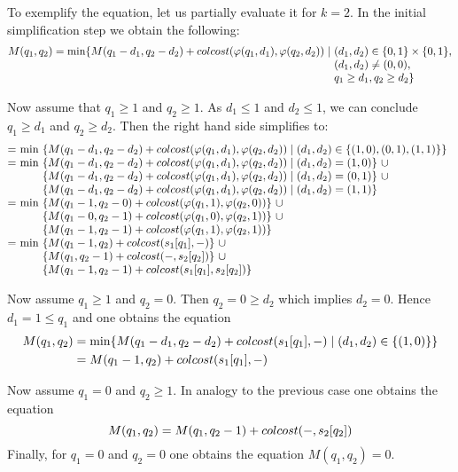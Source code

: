 \documentclass[12pt,a4paper]{scrartcl}
\newcommand{\Set}[1]{\{#1\}}
\newcommand{\Subchar}[2]{#1[#2]}
\newcommand{\Gap}[0]{\mathtt{\symbol{45}}}
\newcommand{\Minexpr}[0]{%
      M(q_{1}-d_{1},q_{2}-d_{2})+colcost(\varphi(q_{1},d_{1}),%
                                         \varphi(q_{2},d_{2}))}
\begin{document}
To exemplify the equation, let us partially evaluate it for \(k=2\).
In the initial simplification step we obtain the following:
\[
\begin{array}{@{}l@{}l@{~}l@{}}
M(q_{1},q_{2})
=\min\{&M(q_{1}-d_{1},q_{2}-d_{2})+colcost(\varphi(q_{1},d_{1}),
                                             \varphi(q_{2},d_{2}))\mid
                     &(d_{1},d_{2})\in\Set{0,1}\times\Set{0,1},\\
                    &&(d_{1},d_{2})\neq (0,0),\\
                    &&q_{1}\geq d_{1},q_{2}\geq d_{2}\}
\end{array}
\]

Now assume that \(q_{1}\geq 1\) and \(q_{2}\geq 1\). As \(d_{1}\leq 1\) and
\(d_{2}\leq 1\), we can conclude \(q_{1}\geq d_{1}\) and \(q_{2}\geq d_{2}\).
Then the right hand side simplifies to:
\[
\begin{array}{@{}l@{~}l@{~}l}
=&\min&\{\Minexpr\mid (d_{1},d_{2})\in\Set{(1,0),(0,1),(1,1)}\}\\
      =&\min&\{\Minexpr\mid (d_{1},d_{2})=(1,0)\}~\cup\\
       &&\{\Minexpr\mid (d_{1},d_{2})=(0,1)\}~\cup\\
       &&\{\Minexpr\mid (d_{1},d_{2})=(1,1)\}\\
=&\min&\{M(q_{1}-1,q_{2}-0)+colcost(\varphi(q_{1},1),\varphi(q_{2},0))\}~\cup\\
&&\{M(q_{1}-0,q_{2}-1)+colcost(\varphi(q_{1},0),\varphi(q_{2},1))\}~\cup\\
&&\{M(q_{1}-1,q_{2}-1)+colcost(\varphi(q_{1},1),\varphi(q_{2},1))\}\\
=&\min&\{M(q_{1}-1,q_{2})+colcost(\Subchar{s_{1}}{q_{1}},\Gap)\}~\cup\\
&&\{M(q_{1},q_{2}-1)+colcost(\Gap,\Subchar{s_{2}}{q_{2}})\}~\cup\\
&&\{M(q_{1}-1,q_{2}-1)+colcost(\Subchar{s_{1}}{q_{1}},\Subchar{s_{2}}{q_{2}})\}
\end{array}
\]

Now assume \(q_{1}\geq 1\) and \(q_{2}=0\). Then
\(q_{2}=0\geq d_{2}\) which implies \(d_{2}=0\). Hence \(d_{1}=1\leq q_{1}\) and
one obtains the equation
\begin{align*}
M(q_{1},q_{2})&=\min\{M(q_{1}-d_{1},q_{2}-d_{2})+colcost(\Subchar{s_{1}}{q_{1}},\Gap)\mid
(d_{1},d_{2})\in\{(1,0)\}\}\\
&=M(q_{1}-1,q_{2})+colcost(\Subchar{s_{1}}{q_{1}},\Gap)
\end{align*}

Now assume \(q_{1}=0\) and \(q_{2}\geq 1\). In analogy to the previous case
one obtains the equation
\[M(q_{1},q_{2})=M(q_{1},q_{2}-1)+colcost(\Gap,\Subchar{s_{2}}{q_{2}})\]
Finally, for \(q_{1}=0\) and \(q_{2}=0\) one obtains the equation
\(M(q_{1},q_{2})=0\).
\end{document}
